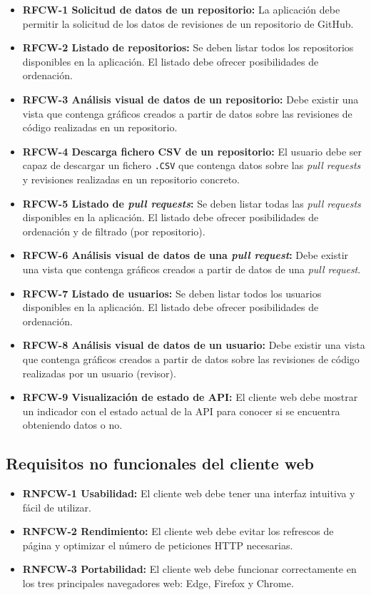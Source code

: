 \begin{itemize}
	\item \textbf{RFCW-1 Solicitud de datos de un repositorio:} La aplicación debe permitir la solicitud de los datos de revisiones de un repositorio de GitHub.
	\item \textbf{RFCW-2 Listado de repositorios:} Se deben listar todos los repositorios disponibles en la aplicación. El listado debe ofrecer posibilidades de ordenación.
	\item \textbf{RFCW-3 Análisis visual de datos de un repositorio:} Debe existir una vista que contenga gráficos creados a partir de datos sobre las revisiones de código realizadas en un repositorio.
	\item \textbf{RFCW-4 Descarga fichero CSV de un repositorio:} El usuario debe ser capaz de descargar un fichero \texttt{.CSV} que contenga datos sobre las \textit{pull requests} y revisiones realizadas en un repositorio concreto.
	\item \textbf{RFCW-5 Listado de \textit{pull requests}:} Se deben listar todas las \textit{pull requests} disponibles en la aplicación. El listado debe ofrecer posibilidades de ordenación y de filtrado (por repositorio).
	\item \textbf{RFCW-6 Análisis visual de datos de una \textit{pull request}:}  Debe existir una vista que contenga gráficos creados a partir de datos de una \textit{pull request}.
	\item \textbf{RFCW-7 Listado de usuarios:} Se deben listar todos los usuarios disponibles en la aplicación. El listado debe ofrecer posibilidades de ordenación.
	\item \textbf{RFCW-8 Análisis visual de datos de un usuario:} Debe existir una vista que contenga gráficos creados a partir de datos sobre las revisiones de código realizadas por un usuario (revisor).
	\item \textbf{RFCW-9 Visualización de estado de API:} El cliente web debe mostrar un indicador con el estado actual de la API para conocer si se encuentra obteniendo datos o no.
\end{itemize}

\subsection{Requisitos no funcionales del cliente web}

\begin{itemize}
	\item \textbf{RNFCW-1 Usabilidad:} El cliente web debe tener una interfaz intuitiva y fácil de utilizar.
	\item \textbf{RNFCW-2 Rendimiento:} El cliente web debe evitar los refrescos de página y optimizar el número de peticiones HTTP necesarias.
	\item \textbf{RNFCW-3 Portabilidad:} El cliente web debe funcionar correctamente en los tres principales navegadores web: Edge, Firefox y Chrome.
\end{itemize}

